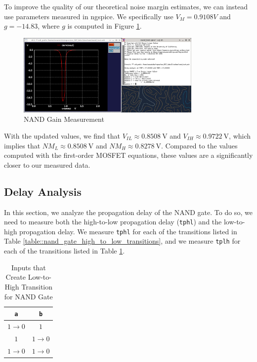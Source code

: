\documentclass[fleqn]{article}
\begin{document}
	To improve the quality of our theoretical noise margin estimates, we can instead use parameters measured in ngspice. We specifically use $V_M = 0.9108 V$ and $g = -14.83$, where $g$ is computed in Figure \ref{fig::nand_noise_analysis_g_sweep_va_vb}.
	
	\begin{figure}[H]
		\centerline{\includegraphics[width=0.8\textwidth]{nand_noise_analysis_g_sweep_va_vb.png}}
		\caption{NAND Gain Measurement}
		\label{fig::nand_noise_analysis_g_sweep_va_vb}
	\end{figure}
	
	\noindent With the updated values, we find that $V_{IL} \approx 0.8508\ \text{V}$ and $V_{IH} \approx 0.9722\ \text{V}$, which implies that $NM_L \approx 0.8508\ \text{V}$ and $NM_H \approx 0.8278\ \text{V}$. Compared to the values computed with the first-order MOSFET equations, these values are a significantly closer to our measured data.
	
	\subsection{Delay Analysis}
	
	In this section, we analyze the propagation delay of the NAND gate. To do so, we need to measure both the high-to-low propagation delay (\texttt{tphl}) and the low-to-high propagation delay. We measure \texttt{tphl} for each of the transitions listed in Table \ref{table::nand_gate_high_to_low_transitions}, and we measure \texttt{tplh} for each of the transitions listed in Table \ref{table::nand_gate_low_to_high_transitions}.
	
	\begin{table}[H]
	\begin{center}
	\caption{Inputs that Create Low-to-High Transition for NAND Gate}
	\label{table::nand_gate_low_to_high_transitions}
	\begin{tabular}{| c | c |}
		\hline
		\texttt{a} & \texttt{b} \\
		\hline	
		$1 \rightarrow 0$ & $1$\\
		\hline	
		$1$ & $1 \rightarrow 0$\\
		\hline	
		$1 \rightarrow 0$ & $1 \rightarrow 0$\\
		\hline
	\end{tabular}
	\end{center}
	\end{table}
	
\end{document}
